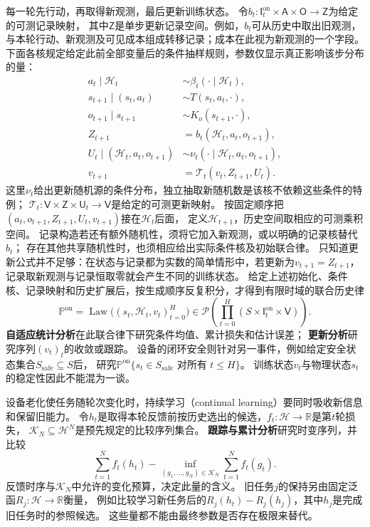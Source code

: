 每一轮先行动，再取得新观测，最后更新训练状态。
令$b_t:\mathsf I_t^{\mathrm{on}}\times\mathsf A\times\mathsf O\to\mathsf Z$为给定的可测记录映射，
其中$\mathsf Z$是单步更新记录空间。例如，$b_t$可从历史中取出旧观测，
与本轮行动、新观测及可见成本组成转移记录；成本在此视为新观测的一个字段。
下面各核规定给定此前全部变量后的条件抽样规则，参数仅显示真正影响该步分布的量：
\begin{equation}
  \begin{aligned}
    a_t\mid\mathscr H_t&\sim\beta_t(\cdot\mid\mathscr H_t),\\
    s_{t+1}\mid(s_t,a_t)&\sim T(s_t,a_t,\cdot),\\
    o_{t+1}\mid s_{t+1}&\sim K_o(s_{t+1},\cdot),\\
    Z_{t+1}&=b_t(\mathscr H_t,a_t,o_{t+1}),\\
    U_t\mid(\mathscr H_t,a_t,o_{t+1})
      &\sim\nu_t(\cdot\mid\mathscr H_t,a_t,o_{t+1}),\\
    v_{t+1}&=\mathcal T_t(v_t,Z_{t+1},U_t).
  \end{aligned}
  \label{eq:future-online-record-update}
\end{equation}
这里$\nu_t$给出更新随机源的条件分布，独立抽取新随机数是该核不依赖这些条件的特例；
$\mathcal T_t:\mathsf V\times\mathsf Z\times\mathsf U_t\to\mathsf V$是给定的可测更新映射。
按固定顺序把$(a_t,o_{t+1},Z_{t+1},U_t,v_{t+1})$接在$\mathscr H_t$后面，
定义$\mathscr H_{t+1}$，历史空间取相应的可测乘积空间。
记录构造若还有额外随机性，须将它加入新观测，或以明确的记录核替代$b_t$；
存在其他共享随机性时，也须相应给出实际条件核及初始联合律。
只知道更新公式并不足够：在状态与记录都为实数的简单情形中，若更新为$v_{t+1}=Z_{t+1}$，
记录取新观测与记录恒取零就会产生不同的训练状态。
给定上述初始化、条件核、记录映射和历史扩展后，按生成顺序反复积分，才得到有限时域的联合历史律
\[
  \mathbb P^{\mathrm{on}}
  =\operatorname{Law}\bigl((s_t,\mathscr H_t,v_t)_{t=0}^H\bigr)
  \in\mathcal P\!\left(\prod_{t=0}^H(S\times\mathsf I_t^{\mathrm{on}}\times\mathsf V)\right).
\]
\textbf{自适应统计分析}在此联合律下研究条件均值、累计损失和估计误差；
\textbf{更新分析}研究序列$(v_t)_t$的收敛或跟踪。
设备的闭环安全则针对另一事件，例如给定安全状态集合$S_{\mathrm{safe}}\subseteq S$后，
研究$\mathbb P^{\mathrm{on}}\{s_t\in S_{\mathrm{safe}}\text{ 对所有 }t\leq H\}$。
训练状态$v_t$与物理状态$s_t$的稳定性因此不能混为一谈。

设备老化使任务随轮次变化时，持续学习（continual learning）要同时吸收新信息和保留旧能力。
令$h_t$是取得本轮反馈前按历史选出的候选，$f_t:\mathcal H\to\mathbb R$是第$t$轮损失，
$\mathcal K_N\subseteq\mathcal H^N$是预先规定的比较序列集合。
\textbf{跟踪与累计分析}研究时变序列，并比较
\[
  \sum_{t=1}^N f_t(h_t)
  -\inf_{(g_1,\ldots,g_N)\in\mathcal K_N}
       \sum_{t=1}^N f_t(g_t).
\]
反馈时序与$\mathcal K_N$中允许的变化预算，决定此量的含义。
旧任务$j$的保持另由固定泛函$R_j:\mathcal H\to\mathbb R$衡量，
例如比较学习新任务后的$R_j(h_t)-R_j(h_j)$，其中$h_j$是完成旧任务时的参照候选。
这些量都不能由最终参数是否存在极限来替代。

